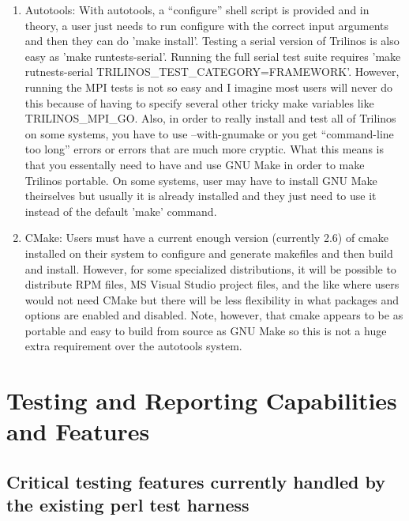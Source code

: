 \documentclass[pdf,ps2pdf,11pt]{SANDreport}
\begin{document}
\begin{enumerate}
\begin{enumerate}
  {}\item Autotools: With autotools, a ``configure'' shell script is
  provided and in theory, a user just needs to run configure with the
  correct input arguments and then they can do 'make install'.
  Testing a serial version of Trilinos is also easy as 'make
  runtests-serial'.  Running the full serial test suite requires 'make
  rutnests-serial TRILINOS\_TEST\_CATEGORY=FRAMEWORK'.  However,
  running the MPI tests is not so easy and I imagine most users will
  never do this because of having to specify several other tricky make
  variables like TRILINOS\_MPI\_GO.  Also, in order to really install
  and test all of Trilinos on some systems, you have to use
  --with-gnumake or you get ``command-line too long'' errors or errors
  that are much more cryptic.  What this means is that you essentally
  need to have and use GNU Make in order to make Trilinos portable.
  On some systems, user may have to install GNU Make theirselves but
  usually it is already installed and they just need to use it instead
  of the default 'make' command.

  {}\item CMake: Users must have a current enough version (currently
  2.6) of cmake installed on their system to configure and generate
  makefiles and then build and install.  However, for some specialized
  distributions, it will be possible to distribute RPM files, MS
  Visual Studio project files, and the like where users would not need
  CMake but there will be less flexibility in what packages and
  options are enabled and disabled.  Note, however, that cmake appears
  to be as portable and easy to build from source as GNU Make so this
  is not a huge extra requirement over the autotools system.

  \end{enumerate}

\end{enumerate}


%
\section{Testing and Reporting Capabilities and Features}
%


%
{}\subsection{Critical testing features currently handled by the
existing perl test harness}
%
\end{document}

